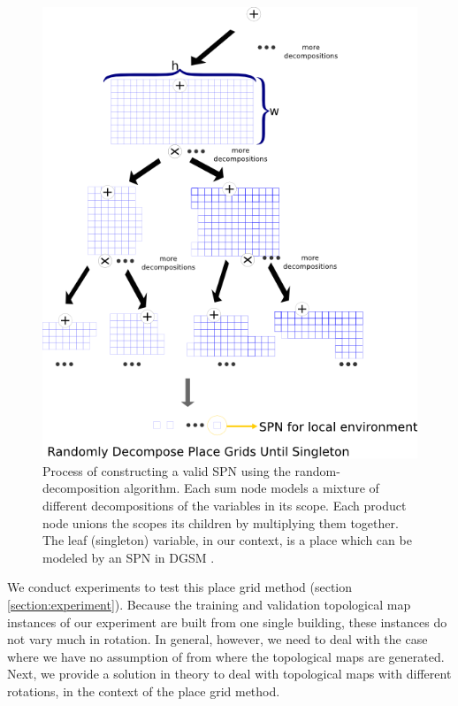 \documentclass[10pt, titlepage]{article}
\theoremstyle{definition}
\begin{document}
\begin{figure}[!htb]
    \centering
    \captionsetup{width=.8\linewidth}
    \includegraphics[scale=0.6]{images/spn_grid.png}
    \caption{Process of constructing a valid SPN using the random-decomposition algorithm. Each sum node models a mixture of different decompositions of the variables in its scope. Each product node unions the scopes its children by multiplying them together. The leaf (singleton) variable, in our context, is a place which can be modeled by an SPN in DGSM \cite{pronobis2016learning}.}
    \label{fig:grid_learn}
\end{figure}

We conduct experiments to test this place grid method (section \ref{section:experiment}). Because the training and validation topological map instances of our experiment are built from one single building, these instances do not vary much in rotation. In general, however, we need to deal with the case where we have no assumption of from where the topological maps are generated. Next, we provide a solution in theory to deal with topological maps with different rotations, in the context of the place grid method.
\end{document}

